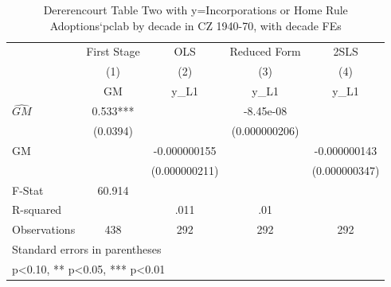 \begin{table}[htbp]\centering
\def\sym#1{\ifmmode^{#1}\else\(^{#1}\)\fi}
\caption{Dererencourt Table Two with y=Incorporations or Home Rule Adoptions`pclab by decade in CZ 1940-70, with decade FEs}
\begin{tabular}{l*{4}{c}}
\toprule
                    & First Stage   &         OLS   &Reduced Form   &        2SLS   \\
                    &\multicolumn{1}{c}{(1)}&\multicolumn{1}{c}{(2)}&\multicolumn{1}{c}{(3)}&\multicolumn{1}{c}{(4)}\\
                    &\multicolumn{1}{c}{GM}&\multicolumn{1}{c}{y\_L1}&\multicolumn{1}{c}{y\_L1}&\multicolumn{1}{c}{y\_L1}\\
\midrule
$\hat{GM}$          &       0.533***&               &   -8.45e-08   &               \\
                    &    (0.0394)   &               &(0.000000206)   &               \\
\addlinespace
GM                  &               &-0.000000155   &               &-0.000000143   \\
                    &               &(0.000000211)   &               &(0.000000347)   \\
\midrule
F-Stat              &      60.914   &               &               &               \\
R-squared           &               &        .011   &         .01   &               \\
Observations        &         438   &         292   &         292   &         292   \\
\bottomrule
\multicolumn{5}{l}{\footnotesize Standard errors in parentheses}\\
\multicolumn{5}{l}{\footnotesize * p<0.10, ** p<0.05, *** p<0.01}\\
\end{tabular}
\end{table}
